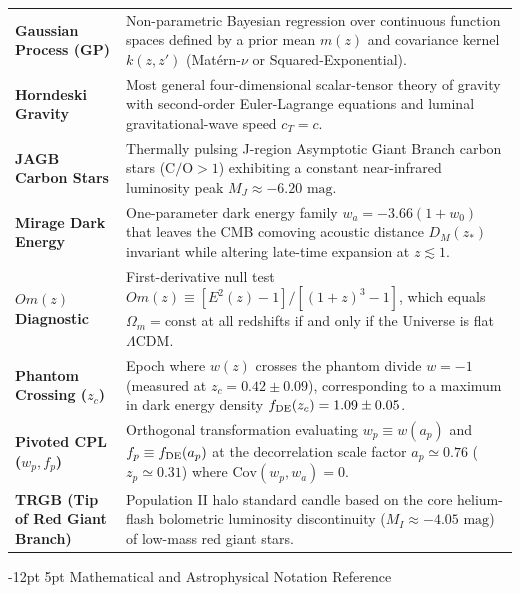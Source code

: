 \documentclass[11pt,letterpaper]{article}
\makeatletter
\renewcommand{\subsection}{\@startsection{subsection}{2}{\z@}%
  {-12pt \@plus -3pt \@minus -1pt}%
  {5pt \@plus 1pt}%
  {\normalfont\large\bfseries\color{tealaccent}}}
\makeatother
\begin{document}
\begin{table}[!htbp]
\begin{tabularx}{\textwidth}{>{\bfseries\color{primary}}p{} X}
Gaussian Process (GP) & Non-parametric Bayesian regression over continuous function spaces defined by a prior mean $m(z)$ and covariance kernel $k(z,z')$ (Matérn-$\nu$ or Squared-Exponential). \\
Horndeski Gravity & Most general four-dimensional scalar-tensor theory of gravity with second-order Euler-Lagrange equations and luminal gravitational-wave speed $c_T = c$. \\
JAGB Carbon Stars & Thermally pulsing J-region Asymptotic Giant Branch carbon stars ($\text{C/O} > 1$) exhibiting a constant near-infrared luminosity peak $M_J \approx -6.20\text{ mag}$. \\
Mirage Dark Energy & One-parameter dark energy family $w_a = -3.66(1+w_0)$ that leaves the CMB comoving acoustic distance $D_M(z_*)$ invariant while altering late-time expansion at $z \lesssim 1$. \\
$Om(z)$ Diagnostic & First-derivative null test $Om(z) \equiv [E^2(z)-1]/[(1+z)^3-1]$, which equals $\Omega_m = \text{const}$ at all redshifts if and only if the Universe is flat $\Lambda$CDM. \\
Phantom Crossing ($z_c$) & Epoch where $w(z)$ crosses the phantom divide $w = -1$ (measured at $z_c = 0.42 \pm 0.09$), corresponding to a maximum in dark energy density $f_{\rm DE}(z_c) = 1.09 \pm 0.05$. \\
Pivoted CPL ($w_p, f_p$) & Orthogonal transformation evaluating $w_p \equiv w(a_p)$ and $f_p \equiv f_{\rm DE}(a_p)$ at the decorrelation scale factor $a_p \simeq 0.76$ ($z_p \simeq 0.31$) where $\text{Cov}(w_p, w_a) = 0$. \\
TRGB (Tip of Red Giant Branch) & Population II halo standard candle based on the core helium-flash bolometric luminosity discontinuity ($M_I \approx -4.05\text{ mag}$) of low-mass red giant stars. \\
\bottomrule
\end{tabularx}
\end{table}

\subsection{Mathematical and Astrophysical Notation Reference}
\end{document}

